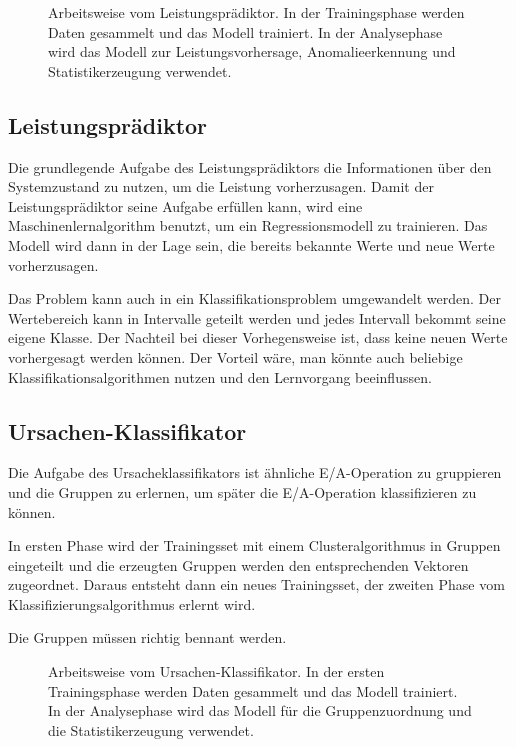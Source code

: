 \begin{figure}[h]
	\hfill
	\subfigure[Training]{
		
		\label{fig:des:perf_training}
	}
	\hfill
	\subfigure[Vorhersage]{
		
		\label{fig:des:perf_prediction}
	}
	\hfill
	\label{fig:des:perf_phases}
	\caption{Arbeitsweise vom Leistungsprädiktor. In der Trainingsphase werden Daten gesammelt und das Modell trainiert. In der Analysephase wird das Modell zur Leistungsvorhersage, Anomalieerkennung und Statistikerzeugung verwendet.}
\end{figure}

\subsection{Leistungsprädiktor}
Die grundlegende Aufgabe des Leistungsprädiktors die Informationen über den Systemzustand zu nutzen, um die Leistung vorherzusagen.
Damit der Leistungsprädiktor seine Aufgabe erfüllen kann, wird eine Maschinenlernalgorithm benutzt, um ein Regressionsmodell zu trainieren.
Das Modell wird dann in der Lage sein, die bereits bekannte Werte und neue Werte vorherzusagen.

Das Problem kann auch in ein Klassifikationsproblem umgewandelt werden. 
Der Wertebereich kann in Intervalle geteilt werden und jedes Intervall bekommt seine eigene Klasse.
Der Nachteil bei dieser Vorhegensweise ist, dass keine neuen Werte vorhergesagt werden können.
Der Vorteil wäre, man könnte auch beliebige Klassifikationsalgorithmen nutzen und den Lernvorgang beeinflussen.





\subsection{Ursachen-Klassifikator}
Die Aufgabe des Ursacheklassifikators ist ähnliche E/A-Operation zu gruppieren und die Gruppen zu erlernen, um später die E/A-Operation klassifizieren zu können.

In ersten Phase wird der Trainingsset mit einem Clusteralgorithmus in Gruppen eingeteilt und die erzeugten Gruppen werden den entsprechenden Vektoren zugeordnet.
Daraus entsteht dann ein neues Trainingsset, der zweiten Phase vom Klassifizierungsalgorithmus erlernt wird.

Die Gruppen müssen richtig bennant werden.

\begin{figure}[h]
	\hfill
	\subfigure[Training]{
		
		\label{fig:des:class_training}
	}
	\hfill
	\subfigure[Vorhersage]{
		
		\label{fig:des:class_prediction}
	}
	\hfill
	\label{fig:des:class_phases}
	\caption{Arbeitsweise vom Ursachen-Klassifikator. In der ersten Trainingsphase werden Daten gesammelt und das Modell trainiert. In der Analysephase wird das Modell für die Gruppenzuordnung und die Statistikerzeugung verwendet.}
\end{figure}


